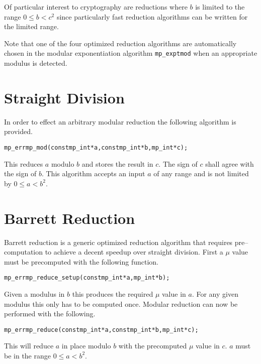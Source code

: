\documentclass[synpaper]{book}
\begin{document}
Of particular interest to cryptography are reductions where $b$ is limited to the range $0 \le b < c^2$ since particularly
fast reduction algorithms can be written for the limited range.

Note that one of the four optimized reduction algorithms are automatically chosen in the modular exponentiation
algorithm \texttt{mp\_exptmod} when an appropriate modulus is detected.

\section{Straight Division}
In order to effect an arbitrary modular reduction the following algorithm is provided.

\begin{alltt}
mp_err mp_mod(const mp_int *a,const  mp_int *b, mp_int *c);
\end{alltt}

This reduces $a$ modulo $b$ and stores the result in $c$.  The sign of $c$ shall agree with the sign
of $b$.  This algorithm accepts an input $a$ of any range and is not limited by $0 \le a < b^2$.

\section{Barrett Reduction}

Barrett reduction is a generic optimized reduction algorithm that requires pre--computation to achieve
a decent speedup over straight division.  First a $\mu$ value must be precomputed with the following function.

\begin{alltt}
mp_err mp_reduce_setup(const mp_int *a, mp_int *b);
\end{alltt}

Given a modulus in $b$ this produces the required $\mu$ value in $a$.  For any given modulus this only has to
be computed once.  Modular reduction can now be performed with the following.

\begin{alltt}
mp_err mp_reduce(const mp_int *a, const mp_int *b, mp_int *c);
\end{alltt}

This will reduce $a$ in place modulo $b$ with the precomputed $\mu$ value in $c$.  $a$ must be in the range
$0 \le a < b^2$.
\end{document}
